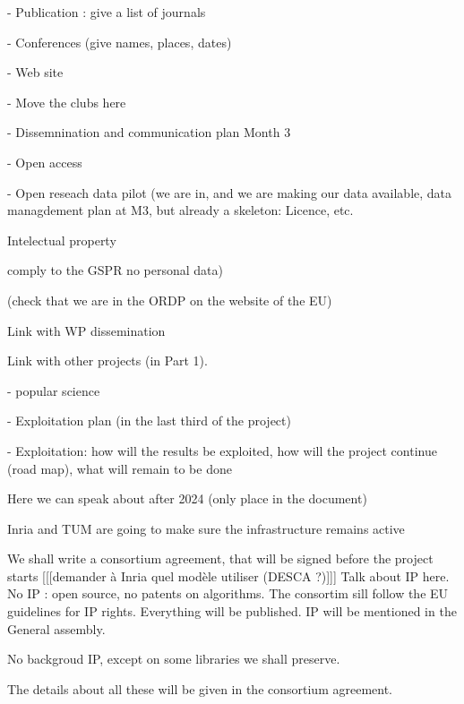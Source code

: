 - Publication : give a list of journals 

- Conferences (give names, places, dates)

- Web site

- Move the clubs here

- Dissemnination and communication plan Month 3

- Open access

- Open reseach data pilot (we are in, and we are making our data available,
data managdement plan at M3, but already a skeleton: Licence, etc.

Intelectual property

comply to the GSPR no personal data)

(check that we are in the ORDP on the website of the EU)

Link with WP dissemination

Link with other projects (in Part 1).

- popular science

- Exploitation plan (in the last third of the project)

- Exploitation: how will the results be exploited, how will the project
continue (road map), what will remain to be done

Here we can speak about after 2024 (only place in the document)

Inria and TUM are going to make sure the infrastructure remains active

We shall write a consortium agreement, that will be signed before the
project starts [[[demander à Inria quel modèle utiliser (DESCA ?)]]]
Talk about IP here. No IP : open source, no patents on algorithms.
The consortim sill follow the EU guidelines for IP rights.
Everything will be published. IP will be mentioned in the General assembly.



No backgroud IP, except on some libraries
we shall preserve.

The details about all these will be given in the consortium agreement.
 






